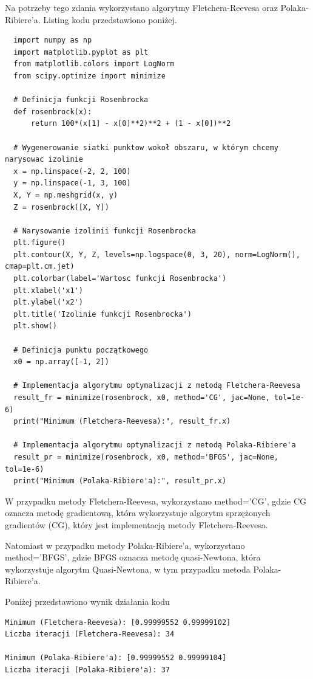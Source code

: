 \documentclass{article}
\begin{document}
Na potrzeby tego zdania wykorzystano algorytmy Fletchera-Reevesa
oraz Polaka-Ribiere’a. Listing kodu przedstawiono poniżej.

\begin{lstlisting}
  import numpy as np
  import matplotlib.pyplot as plt
  from matplotlib.colors import LogNorm
  from scipy.optimize import minimize
  
  # Definicja funkcji Rosenbrocka
  def rosenbrock(x):
      return 100*(x[1] - x[0]**2)**2 + (1 - x[0])**2
  
  # Wygenerowanie siatki punktow wokoł obszaru, w którym chcemy narysowac izolinie
  x = np.linspace(-2, 2, 100)
  y = np.linspace(-1, 3, 100)
  X, Y = np.meshgrid(x, y)
  Z = rosenbrock([X, Y])
  
  # Narysowanie izolinii funkcji Rosenbrocka
  plt.figure()
  plt.contour(X, Y, Z, levels=np.logspace(0, 3, 20), norm=LogNorm(), cmap=plt.cm.jet)
  plt.colorbar(label='Wartosc funkcji Rosenbrocka')
  plt.xlabel('x1')
  plt.ylabel('x2')
  plt.title('Izolinie funkcji Rosenbrocka')
  plt.show()
  
  # Definicja punktu początkowego
  x0 = np.array([-1, 2])
  
  # Implementacja algorytmu optymalizacji z metodą Fletchera-Reevesa
  result_fr = minimize(rosenbrock, x0, method='CG', jac=None, tol=1e-6)
  print("Minimum (Fletchera-Reevesa):", result_fr.x)
  
  # Implementacja algorytmu optymalizacji z metodą Polaka-Ribiere'a
  result_pr = minimize(rosenbrock, x0, method='BFGS', jac=None, tol=1e-6)
  print("Minimum (Polaka-Ribiere'a):", result_pr.x)
\end{lstlisting}  

W przypadku metody Fletchera-Reevesa, wykorzystano method='CG', gdzie CG oznacza metodę gradientową, 
która wykorzystuje algorytm sprzężonych gradientów (CG), który jest implementacją metody Fletchera-Reevesa.

Natomiast w przypadku metody Polaka-Ribiere'a, wykorzystano method='BFGS', gdzie BFGS oznacza metodę quasi-Newtona, 
która wykorzystuje algorytm Quasi-Newtona, w tym przypadku metoda Polaka-Ribiere'a.

Poniżej przedstawiono wynik działania kodu

\begin{lstlisting}
Minimum (Fletchera-Reevesa): [0.99999552 0.99999102]
Liczba iteracji (Fletchera-Reevesa): 34

Minimum (Polaka-Ribiere'a): [0.99999552 0.99999104]
Liczba iteracji (Polaka-Ribiere'a): 37
\end{lstlisting}
\end{document}

